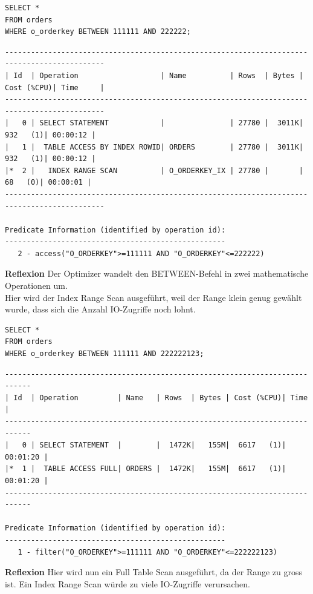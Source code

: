 \documentclass[10pt]{article}
\begin{document}
\begin{lstlisting}[style=sql]
SELECT *
FROM orders
WHERE o_orderkey BETWEEN 111111 AND 222222;
\end{lstlisting}
\begin{lstlisting}[style=queryexecutionplan]
---------------------------------------------------------------------------------------------
| Id  | Operation                   | Name          | Rows  | Bytes | Cost (%CPU)| Time     |
---------------------------------------------------------------------------------------------
|   0 | SELECT STATEMENT            |               | 27780 |  3011K|   932   (1)| 00:00:12 |
|   1 |  TABLE ACCESS BY INDEX ROWID| ORDERS        | 27780 |  3011K|   932   (1)| 00:00:12 |
|*  2 |   INDEX RANGE SCAN          | O_ORDERKEY_IX | 27780 |       |    68   (0)| 00:00:01 |
---------------------------------------------------------------------------------------------

Predicate Information (identified by operation id):
---------------------------------------------------
   2 - access("O_ORDERKEY">=111111 AND "O_ORDERKEY"<=222222)
\end{lstlisting}
\textbf{Reflexion} \newline
Der Optimizer wandelt den BETWEEN-Befehl in zwei mathematische Operationen um.\\
Hier wird der Index Range Scan ausgeführt, weil der Range klein genug gewählt wurde, dass sich die Anzahl IO-Zugriffe noch lohnt.
\newpage
\begin{lstlisting}[style=sql]
SELECT *
FROM orders
WHERE o_orderkey BETWEEN 111111 AND 222222123;
\end{lstlisting}
\begin{lstlisting}[style=queryexecutionplan]
----------------------------------------------------------------------------
| Id  | Operation         | Name   | Rows  | Bytes | Cost (%CPU)| Time     |
----------------------------------------------------------------------------
|   0 | SELECT STATEMENT  |        |  1472K|   155M|  6617   (1)| 00:01:20 |
|*  1 |  TABLE ACCESS FULL| ORDERS |  1472K|   155M|  6617   (1)| 00:01:20 |
----------------------------------------------------------------------------

Predicate Information (identified by operation id):
---------------------------------------------------
   1 - filter("O_ORDERKEY">=111111 AND "O_ORDERKEY"<=222222123)
\end{lstlisting}
\textbf{Reflexion} \newline
Hier wird nun ein Full Table Scan ausgeführt, da der Range zu gross ist. Ein Index Range Scan würde zu viele IO-Zugriffe verursachen.
\end{document}
